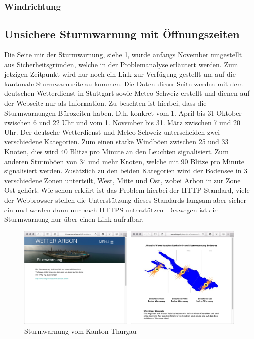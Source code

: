 \subsubsection*{Windrichtung}




\subsection{Unsichere Sturmwarnung mit Öffnungszeiten}
Die Seite mir der Sturmwarnung, siehe \ref{img:sturm}, wurde anfangs November umgestellt aus Sicherheitsgründen, welche in der Problemanalyse erläutert werden. Zum jetzigen Zeitpunkt wird nur noch ein Link zur Verfügung gestellt um auf die kantonale Sturmwarnseite zu kommen. Die Daten dieser Seite werden mit dem deutschen Wetterdienst in Stuttgart sowie Meteo Schweiz erstellt und dienen auf der Webseite nur als Information. Zu beachten ist hierbei, dass die Sturmwarnungen Bürozeiten haben. D.h. konkret vom 1. April bis 31 Oktober zwischen 6 und 22 Uhr und vom 1. November bis 31. März zwischen 7 und 20 Uhr. Der deutsche Wetterdienst und Meteo Schweiz unterscheiden zwei verschiedene Kategorien. Zum einen starke Windböen zwischen 25 und 33 Knoten, dies wird 40 Blitze pro Minute an den Leuchten signalisiert. Zum anderen Sturmböen von 34 und mehr Knoten, welche mit 90 Blitze pro Minute signalisiert werden. Zusätzlich zu den beiden Kategorien wird der Bodensee in 3 verschiedene Zonen unterteilt, West, Mitte und Ost, wobei Arbon in zur Zone Ost gehört. Wie schon erklärt ist das Problem hierbei der HTTP Standard, viele der Webbrowser stellen die Unterstützung dieses Standards langsam aber sicher ein und werden dann nur noch HTTPS unterstützen\cite{Mozilla:DeprecatingNon-SecureHTTP}. Deswegen ist die Sturmwarnung nur über einen Link aufrufbar. 


\begin{figure}[h!]
	\centering
	\includegraphics[width=1\linewidth]{img/sturm}
	\caption{Sturmwarnung vom Kanton Thurgau}
	\label{img:sturm}
\end{figure}




